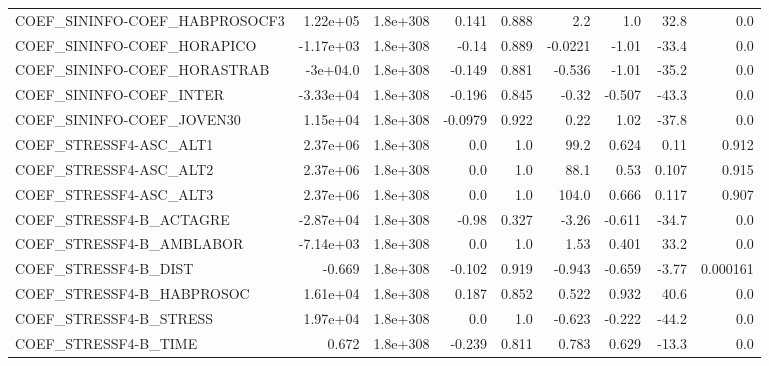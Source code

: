 \begin{tabular}{lrrrrrrrr}
COEF\_SININFO-COEF\_HABPROSOCF3     &    1.22e+05 &     1.8e+308 &    0.141 &    0.888 &        2.2 &         1.0 &         32.8 &           0.0 \\
COEF\_SININFO-COEF\_HORAPICO        &   -1.17e+03 &     1.8e+308 &    -0.14 &    0.889 &    -0.0221 &       -1.01 &        -33.4 &           0.0 \\
COEF\_SININFO-COEF\_HORASTRAB       &    -3e+04.0 &     1.8e+308 &   -0.149 &    0.881 &     -0.536 &       -1.01 &        -35.2 &           0.0 \\
COEF\_SININFO-COEF\_INTER           &   -3.33e+04 &     1.8e+308 &   -0.196 &    0.845 &      -0.32 &      -0.507 &        -43.3 &           0.0 \\
COEF\_SININFO-COEF\_JOVEN30         &    1.15e+04 &     1.8e+308 &  -0.0979 &    0.922 &       0.22 &        1.02 &        -37.8 &           0.0 \\
COEF\_STRESSF4-ASC\_ALT1            &    2.37e+06 &     1.8e+308 &      0.0 &      1.0 &       99.2 &       0.624 &         0.11 &         0.912 \\
COEF\_STRESSF4-ASC\_ALT2            &    2.37e+06 &     1.8e+308 &      0.0 &      1.0 &       88.1 &        0.53 &        0.107 &         0.915 \\
COEF\_STRESSF4-ASC\_ALT3            &    2.37e+06 &     1.8e+308 &      0.0 &      1.0 &      104.0 &       0.666 &        0.117 &         0.907 \\
COEF\_STRESSF4-B\_ACTAGRE           &   -2.87e+04 &     1.8e+308 &    -0.98 &    0.327 &      -3.26 &      -0.611 &        -34.7 &           0.0 \\
COEF\_STRESSF4-B\_AMBLABOR          &   -7.14e+03 &     1.8e+308 &      0.0 &      1.0 &       1.53 &       0.401 &         33.2 &           0.0 \\
COEF\_STRESSF4-B\_DIST              &      -0.669 &     1.8e+308 &   -0.102 &    0.919 &     -0.943 &      -0.659 &        -3.77 &      0.000161 \\
COEF\_STRESSF4-B\_HABPROSOC         &    1.61e+04 &     1.8e+308 &    0.187 &    0.852 &      0.522 &       0.932 &         40.6 &           0.0 \\
COEF\_STRESSF4-B\_STRESS            &    1.97e+04 &     1.8e+308 &      0.0 &      1.0 &     -0.623 &      -0.222 &        -44.2 &           0.0 \\
COEF\_STRESSF4-B\_TIME              &       0.672 &     1.8e+308 &   -0.239 &    0.811 &      0.783 &       0.629 &        -13.3 &           0.0 \\

\end{tabular}

